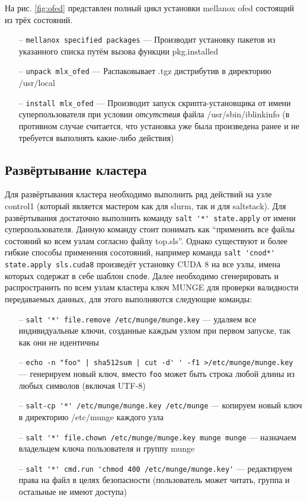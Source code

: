 \documentclass[a4paper]{extarticle}
\begin{document}
На рис. \ref{fig:ofed} представлен полный цикл установки mellanox ofed состоящий из трёх состояний.

\begin{itemize}
\item[--]\texttt{mellanox specified packages} --- Производит установку пакетов из указанного списка путём вызова функции pkg.installed
\item[--]\texttt{unpack mlx\_ofed} --- Распаковывает  .tgz дистрибутив в директорию /usr/local
\item[--]\texttt{install mlx\_ofed} --- Производит запуск скрипта-установщика от имени суперпользователя при условии \emph{отсутствия} файла /usr/sbin/iblinkinfo (в противном случае считается, что установка уже была произведена ранее и не требуется выполнять какие-либо действия)
\end{itemize}

\subsection{Развёртывание кластера}

Для развёртывания кластера необходимо выполнить ряд действий на узле control1 (который является мастером как для slurm, так и для saltstack). Для развёртывания достаточно выполнить команду \verb|salt '*' state.apply| от имени суперпользователя. Данную команду стоит понимать как \enquote{применить все файлы состояний ко всем узлам согласно файлу top.sls}. Однако существуют и более гибкие способы применения сосотояний, например команда \verb|salt 'cnod*' state.apply sls.cuda8| произведёт установку CUDA 8 на все узлы, имена которых содержат в себе шаблон \texttt{cnode}.
Далее необходимо сгенерировать и распространить по всем узлам кластера ключ MUNGE для проверки валидности передаваемых данных, для этого выполняются следующие команды:

\begin{samepage}
\begin{itemize}
\item[--]\verb|salt '*' file.remove /etc/munge/munge.key| --- удаляем все индивидуальные ключи, созданные каждым узлом при первом запуске, так как они не идентичны
\item[--]\verb#echo -n "foo" | sha512sum | cut -d' ' -f1 >/etc/munge/munge.key# --- генерируем новый ключ, вместо \texttt{foo} может быть строка любой длины из любых символов (включая UTF-8)
\item[--]\verb|salt-cp '*' /etc/munge/munge.key /etc/munge| --- копируем новый ключ в директорию /etc/munge каждого узла
\item[--]\verb|salt '*' file.chown /etc/munge/munge.key munge munge| --- назначаем владельцем ключа пользователя и группу munge
\item[--]\verb|salt '*' cmd.run 'chmod 400 /etc/munge/munge.key'| --- редактируем права на файл в целях безопасности (пользователь может читать, группа и остальные не имеют доступа)
\end{itemize}
\end{samepage}
\end{document}
